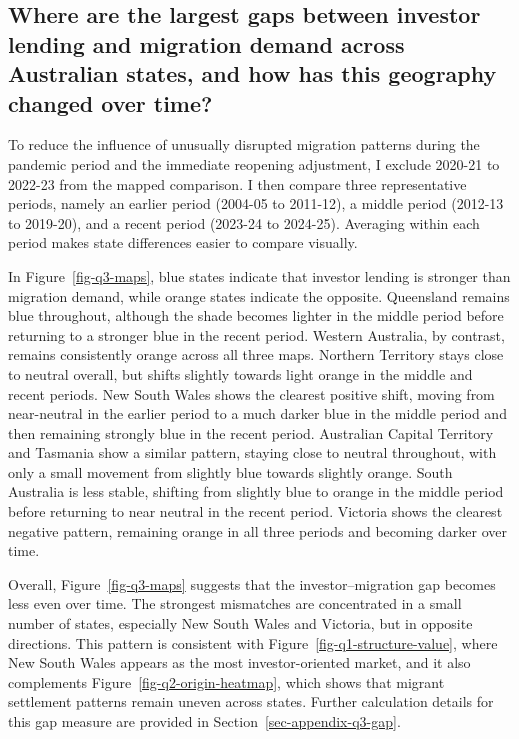 \documentclass[
  11pt,
  a4paper,
]{article}
\begin{document}
\subsection{Where are the largest gaps between investor lending and
migration demand across Australian states, and how has this geography
changed over
time?}\label{where-are-the-largest-gaps-between-investor-lending-and-migration-demand-across-australian-states-and-how-has-this-geography-changed-over-time}

To reduce the influence of unusually disrupted migration patterns during
the pandemic period and the immediate reopening adjustment, I exclude
2020-21 to 2022-23 from the mapped comparison. I then compare three
representative periods, namely an earlier period (2004-05 to 2011-12), a
middle period (2012-13 to 2019-20), and a recent period (2023-24 to
2024-25). Averaging within each period makes state differences easier to
compare visually.

In Figure~\ref{fig-q3-maps}, blue states indicate that investor lending
is stronger than migration demand, while orange states indicate the
opposite. Queensland remains blue throughout, although the shade becomes
lighter in the middle period before returning to a stronger blue in the
recent period. Western Australia, by contrast, remains consistently
orange across all three maps. Northern Territory stays close to neutral
overall, but shifts slightly towards light orange in the middle and
recent periods. New South Wales shows the clearest positive shift,
moving from near-neutral in the earlier period to a much darker blue in
the middle period and then remaining strongly blue in the recent period.
Australian Capital Territory and Tasmania show a similar pattern,
staying close to neutral throughout, with only a small movement from
slightly blue towards slightly orange. South Australia is less stable,
shifting from slightly blue to orange in the middle period before
returning to near neutral in the recent period. Victoria shows the
clearest negative pattern, remaining orange in all three periods and
becoming darker over time.

Overall, Figure~\ref{fig-q3-maps} suggests that the investor--migration
gap becomes less even over time. The strongest mismatches are
concentrated in a small number of states, especially New South Wales and
Victoria, but in opposite directions. This pattern is consistent with
Figure~\ref{fig-q1-structure-value}, where New South Wales appears as
the most investor-oriented market, and it also complements
Figure~\ref{fig-q2-origin-heatmap}, which shows that migrant settlement
patterns remain uneven across states. Further calculation details for
this gap measure are provided in Section~\ref{sec-appendix-q3-gap}.
\end{document}
